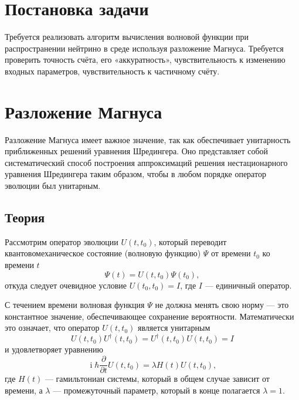 \documentclass[12pt]{article}
\DeclareMathOperator\Iunit{i}
\renewcommand\imath\Iunit
\begin{document}
\newpage 

\section{Постановка задачи}

Требуется реализовать алгоритм вычисления волновой функции при распространении
нейтрино в среде используя разложение Магнуса. Требуется проверить точность
счёта, его «аккуратность», чувствительность к изменению входных параметров,
чувствительность к частичному счёту.


\section{Разложение Магнуса}

Разложение Магнуса имеет важное значение, так как обеспечивает унитарность
приближенных решений уравнения Шредингера. Оно представляет собой
систематический способ построения аппроксимаций решения нестационарного
уравнения Шредингера таким образом, чтобы в любом порядке оператор эволюции был
унитарным.

\subsection{Теория}

Рассмотрим оператор эволюции $U(t,t_0)$, который переводит квантовомеханическое
состояние (волновую функцию) $\Psi$ от времени $t_0$ ко времени $t$
%
\begin{equation}
  \Psi(t)=U(t,t_0)\Psi(t_0),
\end{equation}
откуда следует очевидное условие $U(t_0,t_0)=I$, где $I$ — единичный оператор.

С течением времени волновая функция $\Psi$ не должна менять свою норму — это
константное значение, обеспечивающее сохранение вероятности. Математически это
означает, что оператор $U(t,t_0)$ является унитарным
\begin{equation}
  U(t,t_0)U^\dagger(t,t_0)=U^\dagger(t,t_0)U(t,t_0)=I
\end{equation}
и удовлетворяет уравнению
\begin{equation}\label{HU}
  \imath\hbar\frac{\partial}{\partial t} U(t,t_0)=\lambda H(t)U(t,t_0),
\end{equation}
где $H(t)$ — гамильтониан системы, который в общем случае зависит от времени, а
$\lambda$ — промежуточный параметр, который в конце полагается $\lambda=1$.
\end{document}

